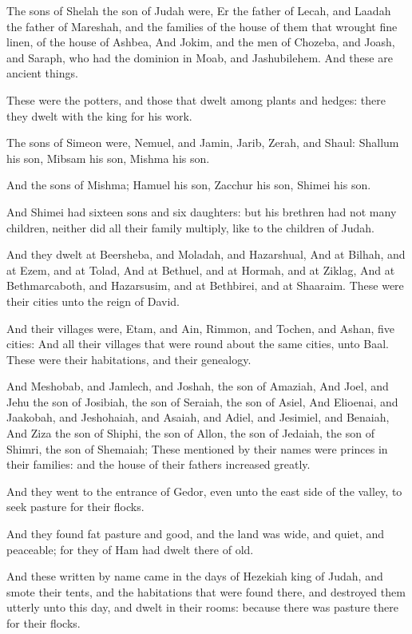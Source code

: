 \Verse The sons of Shelah the son of Judah were, Er the father of Lecah, and Laadah the father of Mareshah, and the families of the house of them that wrought fine linen, of the house of Ashbea, \Verse And Jokim, and the men of Chozeba, and Joash, and Saraph, who had the dominion in Moab, and Jashubilehem. And these are ancient things.

\Verse These were the potters, and those that dwelt among plants and hedges: there they dwelt with the king for his work.

\Verse The sons of Simeon were, Nemuel, and Jamin, Jarib, Zerah, and Shaul: \Verse Shallum his son, Mibsam his son, Mishma his son.

\Verse And the sons of Mishma; Hamuel his son, Zacchur his son, Shimei his son.

\Verse And Shimei had sixteen sons and six daughters: but his brethren had not many children, neither did all their family multiply, like to the children of Judah.

\Verse And they dwelt at Beersheba, and Moladah, and Hazarshual, \Verse And at Bilhah, and at Ezem, and at Tolad, \Verse And at Bethuel, and at Hormah, and at Ziklag, \Verse And at Bethmarcaboth, and Hazarsusim, and at Bethbirei, and at Shaaraim. These were their cities unto the reign of David.

\Verse And their villages were, Etam, and Ain, Rimmon, and Tochen, and Ashan, five cities: \Verse And all their villages that were round about the same cities, unto Baal. These were their habitations, and their genealogy.

\Verse And Meshobab, and Jamlech, and Joshah, the son of Amaziah, \Verse And Joel, and Jehu the son of Josibiah, the son of Seraiah, the son of Asiel, \Verse And Elioenai, and Jaakobah, and Jeshohaiah, and Asaiah, and Adiel, and Jesimiel, and Benaiah, \Verse And Ziza the son of Shiphi, the son of Allon, the son of Jedaiah, the son of Shimri, the son of Shemaiah; \Verse These mentioned by their names were princes in their families: and the house of their fathers increased greatly.

\Verse And they went to the entrance of Gedor, even unto the east side of the valley, to seek pasture for their flocks.

\Verse And they found fat pasture and good, and the land was wide, and quiet, and peaceable; for they of Ham had dwelt there of old.

\Verse And these written by name came in the days of Hezekiah king of Judah, and smote their tents, and the habitations that were found there, and destroyed them utterly unto this day, and dwelt in their rooms: because there was pasture there for their flocks.

